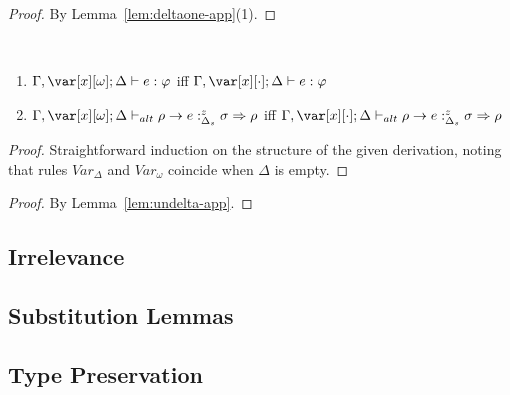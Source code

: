 \documentclass[acmsmall,review,anonymous]{acmart}
\begin{document}
\deltaone*
\begin{proof}
By Lemma~\ref{lem:deltaone-app}(1).
\end{proof}

\begin{lemma}~\label{lem:undelta-app}
  \begin{enumerate}
    \item $\G,\xo; \D \vdash e : \vp$ iff $\G,\x[\cdot]; \D \vdash e :
      \vp$
    \item $\G,\xo;\D \vdash_{alt} \rho \rightarrow e
      :^z_{\Delta_s} \sigma \Rightarrow \rho$ iff
      $\G,\x[\cdot];\D \vdash_{alt} \rho \rightarrow e
   :^z_{\Delta_s} \sigma \Rightarrow \rho$
  \end{enumerate}
\end{lemma}
\begin{proof}
Straightforward induction on the structure of the given derivation,
noting that rules $\mathit{Var}_\Delta$ and $\mathit{Var}_\omega$
coincide when $\Delta$ is empty.
\end{proof}

\undelta*

\begin{proof}
By Lemma~\ref{lem:undelta-app}.
\end{proof}


\subsection{Irrelevance\label{sec:proof:irrelevance}}



\subsection{Substitution Lemmas\label{sec:proof:substitution-lemmas}}









\subsection{Type Preservation\label{sec:proof:type-preservation}}


\end{document}
